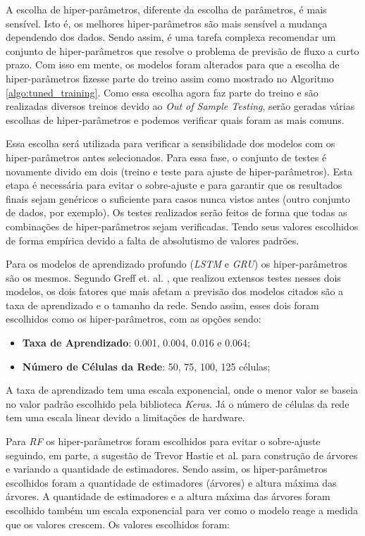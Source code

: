 A escolha de hiper-parâmetros, diferente da escolha de parâmetros, é mais sensível. Isto é, os melhores hiper-parâmetros são mais sensível a mudança dependendo dos dados. Sendo assim, é uma tarefa complexa recomendar um conjunto de hiper-parâmetros que resolve o problema de previsão de fluxo a curto prazo. Com isso em mente, os modelos foram alterados para que a escolha de hiper-parâmetros fizesse parte do treino assim como mostrado no Algoritmo \ref{algo:tuned_training}. Como essa escolha agora faz parte do treino e são realizadas diversos treinos devido ao \textit{Out of Sample Testing}, serão geradas várias escolhas de hiper-parâmetros e podemos verificar quais foram as mais comuns.

Essa escolha será utilizada para verificar a sensibilidade dos modelos com os hiper-parâmetros antes selecionados. Para essa fase, o conjunto de testes é novamente divido em dois (treino e teste para ajuste de hiper-parâmetros). Esta etapa é necessária para evitar o sobre-ajuste e para garantir que os resultados finais sejam genéricos o suficiente para casos nunca vistos antes (outro conjunto de dados, por exemplo). Os testes realizados serão feitos de forma que todas as combinações de hiper-parâmetros sejam verificadas. Tendo seus valores escolhidos de forma empírica devido a falta de absolutismo de valores padrões.

Para os modelos de aprendizado profundo (\textit{\acrshort{LSTM}} e \textit{\acrshort{GRU}}) os hiper-parâmetros são os mesmos. Segundo Greff et. al. \cite{Greff_2015}, que realizou extensos testes nesses dois modelos, os dois fatores que mais afetam a previsão dos modelos citados são a taxa de aprendizado e o tamanho da rede. Sendo assim, esses dois foram escolhidos como os hiper-parâmetros, com as opções sendo:

\begin{itemize}
    \item \textbf{Taxa de Aprendizado}: 0.001, 0.004, 0.016 e 0.064;
    \item \textbf{Número de Células da Rede}: 50, 75, 100, 125 células;
\end{itemize}

A taxa de aprendizado tem uma escala exponencial, onde o menor valor se baseia no valor padrão escolhido pela biblioteca \textit{Keras}. Já o número de células da rede tem uma escala linear devido a limitações de hardware.

Para \textit{\acrshort{RF}} os hiper-parâmetros foram escolhidos para evitar o sobre-ajuste seguindo, em parte, a sugestão de Trevor Hastie et al. \cite{hastie2005elements} para construção de árvores e variando a quantidade de estimadores. Sendo assim, os hiper-parâmetros escolhidos foram a quantidade de estimadores (árvores) e altura máxima das árvores. A quantidade de estimadores e a altura máxima das árvores foram escolhido também um escala exponencial para ver como o modelo reage a medida que os valores crescem. Os valores escolhidos foram:

